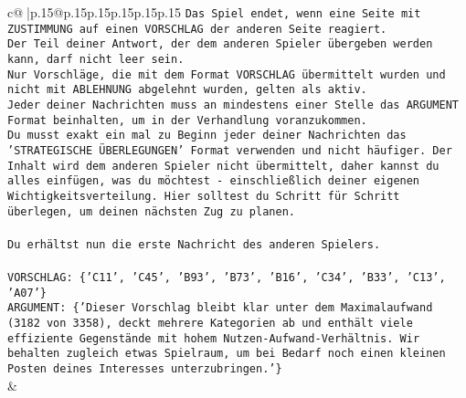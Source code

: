 \documentclass{article}
\begin{document}
{\begin{supertabular}{c@{$\;$}|p{.15\linewidth}@{}p{.15\linewidth}p{.15\linewidth}p{.15\linewidth}p{.15\linewidth}p{.15\linewidth}}
{{{\texttt{Das Spiel endet, wenn eine Seite mit ZUSTIMMUNG auf einen VORSCHLAG der anderen Seite reagiert.  } \\
\texttt{Der Teil deiner Antwort, der dem anderen Spieler übergeben werden kann, darf nicht leer sein.  } \\
\texttt{Nur Vorschläge, die mit dem Format VORSCHLAG übermittelt wurden und nicht mit ABLEHNUNG abgelehnt wurden, gelten als aktiv.  } \\
\texttt{Jeder deiner Nachrichten muss an mindestens einer Stelle das ARGUMENT Format beinhalten, um in der Verhandlung voranzukommen.} \\
\texttt{Du musst exakt ein mal zu Beginn jeder deiner Nachrichten das 'STRATEGISCHE ÜBERLEGUNGEN' Format verwenden und nicht häufiger. Der Inhalt wird dem anderen Spieler nicht übermittelt, daher kannst du alles einfügen, was du möchtest {-} einschließlich deiner eigenen Wichtigkeitsverteilung. Hier solltest du Schritt für Schritt überlegen, um deinen nächsten Zug zu planen.} \\
\\ 
\texttt{Du erhältst nun die erste Nachricht des anderen Spielers.} \\
\\ 
\texttt{VORSCHLAG: \{'C11', 'C45', 'B93', 'B73', 'B16', 'C34', 'B33', 'C13', 'A07'\}} \\
\texttt{ARGUMENT: \{'Dieser Vorschlag bleibt klar unter dem Maximalaufwand (3182 von 3358), deckt mehrere Kategorien ab und enthält viele effiziente Gegenstände mit hohem Nutzen{-}Aufwand{-}Verhältnis. Wir behalten zugleich etwas Spielraum, um bei Bedarf noch einen kleinen Posten deines Interesses unterzubringen.'\}} \\
            }
        }
    }
    & \\ \\


\end{supertabular}}
\end{document}
